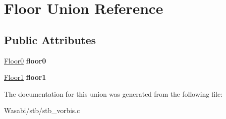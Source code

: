 \hypertarget{union_floor}{}\section{Floor Union Reference}
\label{union_floor}
\subsection*{Public Attributes}
\begin{DoxyCompactItemize}
\item 
\hyperlink{struct_floor0}{Floor0} {\bfseries floor0}\hypertarget{union_floor_a2330ff2cbd7ee66f38487546bbe03453}{}\label{union_floor_a2330ff2cbd7ee66f38487546bbe03453}

\item 
\hyperlink{struct_floor1}{Floor1} {\bfseries floor1}\hypertarget{union_floor_adc1ac1b2639d665d8a7df65714a03f95}{}\label{union_floor_adc1ac1b2639d665d8a7df65714a03f95}

\end{DoxyCompactItemize}


The documentation for this union was generated from the following file\+:\begin{DoxyCompactItemize}
\item 
Wasabi/stb/stb\+\_\+vorbis.\+c\end{DoxyCompactItemize}
